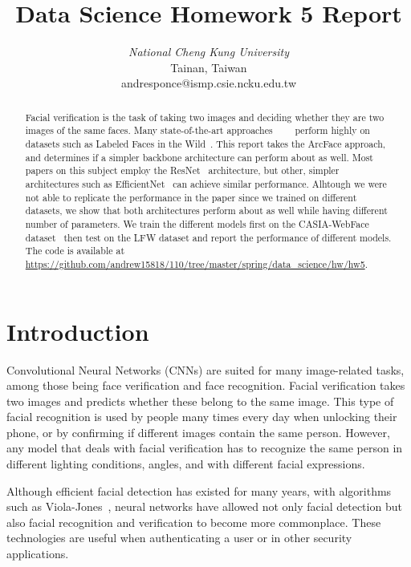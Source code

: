 \documentclass[conference]{IEEEtran}
\begin{document}
\title{Data Science Homework 5 Report}
\author{
		\textit{National Cheng Kung University}\\
		Tainan, Taiwan\\
		andresponce@ismp.csie.ncku.edu.tw
}
\maketitle
\begin{abstract}
	Facial verification is the task of taking two images and 
	deciding whether they are two images of the same faces.
	Many state-of-the-art approaches~\cite{yan2019vargfacenet}~\cite{Deng_2019_CVPR}~\cite{Shi_2019_ICCV}~\cite{boutros2019elastic}
	perform highly on datasets such as Labeled Faces in the Wild~\cite{LFWTech}.
	This report takes the ArcFace approach, and determines if a simpler backbone 
	architecture can perform about as well.
	Most papers on this subject employ the ResNet~\cite{he2016deep} architecture,
	but other, simpler architectures such as EfficientNet~\cite{tan2019efficientnet}
	can achieve similar performance.
	Alhtough we were not able to replicate the performance in the paper since we trained on
	different datasets, we show that both architectures perform about as well while 
	having different number of parameters.
	We train the different models first on the CASIA-WebFace dataset~\cite{casiawebface} then test
	on the LFW dataset and report the performance of different models.
	The code is available at \url{https://github.com/andrew15818/110/tree/master/spring/data_science/hw/hw5}.
\end{abstract}

\section{Introduction}
Convolutional Neural Networks (CNNs) are suited for many image-related tasks,
among those being face verification and face recognition.
Facial verification takes two images and predicts whether these belong to the same image.
This type of facial recognition is used by people many times every day when unlocking their phone,
or by confirming if different images contain the same person.
However, any model that deals with facial verification has to recognize the same person in different 
lighting conditions, angles, and with different facial expressions.

Although efficient facial detection has existed for many years, with algorithms such as 
Viola-Jones~\cite{viola2001rapid}, neural networks have allowed not only facial detection 
but also facial recognition and verification to become more commonplace.
These technologies are useful when authenticating a user or in other 
security applications.
\end{document}
